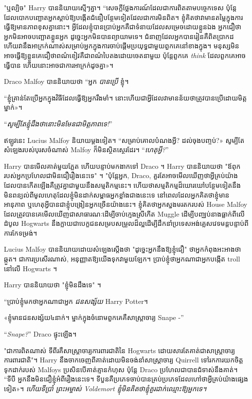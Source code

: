 {"ឬល្បិច" Harry បាននិយាយស្មើៗគ្នា។ “សេចក្តីថ្លែងការណ៍ដែលជាការពិតតាមបច្ចេកទេស ប៉ុន្តែដែលបោកបញ្ឆោតអ្នកស្តាប់ឱ្យបង្កើតជំនឿបន្ថែមទៀតដែលជាការមិនពិត។ ខ្ញុំ​គិត​ថា​វា​មាន​តម្លៃ​ក្នុង​ការ​ធ្វើ​ឱ្យ​មាន​ភាព​ខុស​គ្នា​នោះ​។ អ្វីដែលខ្ញុំបានប្រាប់អ្នកគឺជាទំនាយដែលសម្រេចដោយខ្លួនឯង អ្នកជឿថាអ្នកមិនអាចបញ្ឆោតខ្លួនអ្នក ដូច្នេះអ្នកមិនបានព្យាយាមទេ។ ជំនាញដែលអ្នកបានរៀនគឺពិតប្រាកដ ហើយវានឹងអាក្រក់ណាស់សម្រាប់អ្នកក្នុងការចាប់ផ្តើមប្រយុទ្ធជាមួយពួកគេនៅខាងក្នុង។ មនុស្ស​មិន​អាច​ធ្វើ​ឱ្យ​ខ្លួន​គេ​ជឿ​ថា​ពណ៌​ខៀវ​គឺ​ជា​ពណ៌​បៃតង​ដោយ​ចេតនា​មួយ ប៉ុន្តែ​ពួក​គេ \emph{ think} ដែល​ពួក​គេ​អាច​ធ្វើ​បាន ហើយ​នោះ​អាច​ជា​ការ​អាក្រក់​ដូច​គ្នា»។

Draco Malfoy បាននិយាយថា “អ្នក \emph{បានប្រើ} ខ្ញុំ។

“ខ្ញុំគ្រាន់តែប្រើអ្នកក្នុងវិធីដែលធ្វើឱ្យអ្នករឹងមាំ។ នោះ​ហើយ​ជា​អ្វី​ដែល​វា​មាន​ន័យ​ថា​ត្រូវ​បាន​ប្រើ​ដោយ​មិត្ត​ម្នាក់​»។

“\emph{សូម្បីតែខ្ញុំដឹងថានោះមិនមែនជាមិត្តភាពទេ!}”

ឥឡូវនេះ Lucius Malfoy និយាយម្តងទៀត។ “សម្រាប់គោលបំណងអ្វី? ដល់​ចុង​បញ្ចប់?» សូម្បី​តែ​សំឡេង​របស់​បុរស​ចំណាស់ Malfoy ក៏​មិន​ស្ថិតស្ថេរ​ដែរ។ “\emph{ហេតុអ្វី?}”

Harry បានមើលគាត់មួយភ្លែត ហើយបន្ទាប់មកងាកទៅ Draco ។ Harry បាននិយាយថា "ឪពុករបស់អ្នកប្រហែលជាមិនជឿរឿងនេះទេ" ។ "ប៉ុន្តែអ្នក, Draco, គួរតែអាចមើលឃើញថាអ្វីគ្រប់យ៉ាងដែលបានកើតឡើងគឺត្រូវគ្នាជាមួយនឹងសម្មតិកម្មនេះ។ ហើយថាសម្មតិកម្មដ៏ឃោរឃៅបន្ថែមទៀតនឹងមិនពន្យល់ពីមូលហេតុដែលខ្ញុំមិនដាក់សម្ពាធអ្នកខ្លាំងជាងនេះទេ នៅពេលដែលអ្នកគិតថាខ្ញុំមានអានុភាព ឬហេតុអ្វីបានជាខ្ញុំបង្រៀនអ្នកច្រើនយ៉ាងនេះ។ ខ្ញុំគិតថាអ្នកស្នងមរតករបស់ House Malfoy ដែលត្រូវបានគេមើលឃើញជាសាធារណៈដើម្បីចាប់ក្មេងស្រីកើត Muggle ដើម្បីបញ្ឈប់នាងធ្លាក់ពីលើដំបូល Hogwarts នឹងក្លាយជាបេក្ខជនសម្របសម្រួលដ៏ល្អដើម្បីដឹកនាំប្រទេសអង់គ្លេសវេទមន្តបន្ទាប់ពីការកែទម្រង់។

Lucius Malfoy បាននិយាយដោយសំឡេងស្តើងថា "ដូច្នេះអ្នកនឹងឱ្យខ្ញុំជឿ" ថាអ្នកកំពុងអះអាងថាឆ្កួត។ ជាការប្រសើរណាស់, អនុញ្ញាតឱ្យយើងទុកវាមួយឡែក។ ប្រាប់ខ្ញុំថាអ្នកណាជាអ្នកបង្កើត troll នៅលើ Hogwarts ។

Harry បាននិយាយថា "ខ្ញុំមិនដឹងទេ" ។

“ប្រាប់ខ្ញុំមកថាអ្នកណាជាអ្នក \emph{ជនសង្ស័យ} Harry Potter។

«​ខ្ញុំ​មាន​ជនសង្ស័យ​៤​នាក់​។ ម្នាក់ក្នុងចំនោមពួកគេគឺសាស្រ្តាចារ្យ Snape -”

“\emph{Snape?}” Draco ផ្ទុះឡើង។

"ជាការពិតណាស់ ទីពីរគឺសាស្រ្តាចារ្យការពារជាតិនៃ Hogwarts ដោយសារតែគាត់ជាសាស្រ្តាចារ្យការពារជាតិ"។ Harry នឹងចាកចេញពីគាត់ដោយមិនចង់នាំសាស្រ្តាចារ្យ Quirrell ទៅរកការយកចិត្តទុកដាក់របស់ Malfoys ប្រសិនបើគាត់គ្មានកំហុស ប៉ុន្តែ Draco ប្រហែលជាបានជំទាស់នឹងគាត់។ “ទីបី អ្នកនឹងមិនជឿខ្ញុំអំពីរឿងនេះទេ។ ទី​បួន​គឺ​ប្រភេទ​ចាប់​បាន​គ្រប់​ប្រភេទ​ដែល​ហៅ​ថា​អ្វី​គ្រប់​យ៉ាង​ផ្សេង​ទៀត»។ \emph{ហើយទីប្រាំ ព្រះអម្ចាស់ Voldemort ខ្ញុំមិនគិតថាខ្ញុំគួរដាក់ឈ្មោះឱ្យអ្នកទេ។}

}
